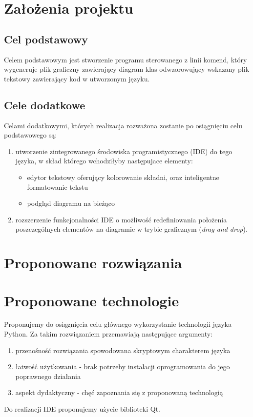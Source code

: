 \documentclass[a4paper,11pt]{article}
\begin{document}
\section{Założenia projektu}

\subsection{Cel podstawowy}
Celem podstawowym jest stworzenie programu sterowanego z linii komend, który wygeneruje plik
graficzny zawierający diagram klas odwzorowujący wskazany plik tekstowy zawierający kod w utworzonym
języku.

\subsection{Cele dodatkowe}
Celami dodatkowymi, których realizacja rozważona zostanie po osiągnięciu celu podstawowego są:
\begin{enumerate}
  \item{
    utworzenie zintegrowanego środowiska programistycznego (IDE) do tego języka, w skład którego
    wchodziłyby następujace elementy:
    \begin{itemize}
      \item{edytor tekstowy oferujący kolorowanie składni, oraz inteligentne formatowanie tekstu}
      \item{podgląd diagramu na bieżąco}
    \end{itemize}
  }
  \item{rozszerzenie funkcjonalności IDE o możliwość redefiniowania położenia poszczególnych
    elementów na diagramie w trybie graficznym (\emph{drag and drop}).}
\end{enumerate}
\section{Proponowane rozwiązania}

\section{Proponowane technologie}
Proponujemy do osiągnięcia celu głównego wykorzystanie technologii języka Python. Za takim
rozwiązaniem przemawiają następujące argumenty:
\begin{enumerate}
  \item{przenośność rozwiązania spowodowana skryptowym charakterem języka}
  \item{łatwość użytkowania - brak potrzeby instalacji oprogramowania do jego poprawnego działania}
  \item{aspekt dydaktyczny - chęć zapoznania się z proponowaną technologią}
\end{enumerate}
Do realizacji IDE proponujemy użycie biblioteki Qt.
\end{document}
